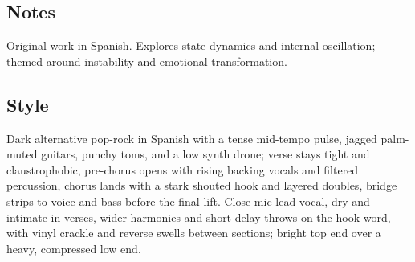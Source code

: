 \subsection{Notes}
Original work in Spanish.
Explores state dynamics and internal oscillation; themed around instability and emotional transformation.

\subsection{Style}
Dark alternative pop-rock in Spanish with a tense mid-tempo pulse, jagged palm-muted guitars, punchy toms, and a low synth drone; verse stays tight and claustrophobic, pre-chorus opens with rising backing vocals and filtered percussion, chorus lands with a stark shouted hook and layered doubles, bridge strips to voice and bass before the final lift. Close-mic lead vocal, dry and intimate in verses, wider harmonies and short delay throws on the hook word, with vinyl crackle and reverse swells between sections; bright top end over a heavy, compressed low end.

